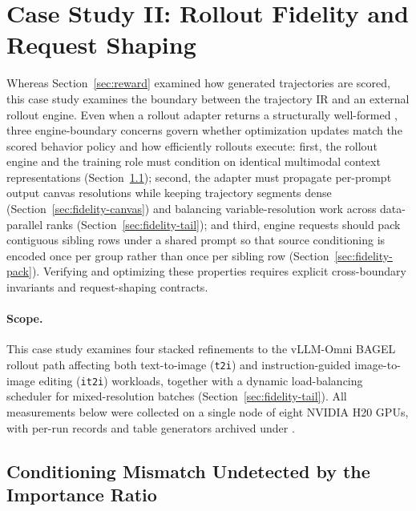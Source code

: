 

\section{Case Study II: Rollout Fidelity and Request Shaping}
\label{sec:fidelity}

Whereas Section~\ref{sec:reward} examined how generated trajectories are scored, this case study examines the boundary between the trajectory IR and an external rollout engine.
Even when a rollout adapter returns a structurally well-formed \sample{}, three engine-boundary concerns govern whether optimization updates match the scored behavior policy and how efficiently rollouts execute:
first, the rollout engine and the training role must condition on identical multimodal context representations (Section~\ref{sec:fidelity-layout});
second, the adapter must propagate per-prompt output canvas resolutions while keeping trajectory segments dense (Section~\ref{sec:fidelity-canvas}) and balancing variable-resolution work across data-parallel ranks (Section~\ref{sec:fidelity-tail});
and third, engine requests should pack contiguous sibling rows under a shared prompt so that source conditioning is encoded once per group rather than once per sibling row (Section~\ref{sec:fidelity-pack}).
Verifying and optimizing these properties requires explicit cross-boundary invariants and request-shaping contracts.

\paragraph{Scope.}
This case study examines four stacked refinements to the vLLM-Omni BAGEL rollout path affecting both text-to-image (\texttt{t2i}) and instruction-guided image-to-image editing (\texttt{it2i}) workloads, together with a dynamic load-balancing scheduler for mixed-resolution batches (Section~\ref{sec:fidelity-tail}).
All measurements below were collected on a single node of eight NVIDIA H20 GPUs, with per-run records and table generators archived under .

\subsection{Conditioning Mismatch Undetected by the Importance Ratio}
\label{sec:fidelity-layout}

